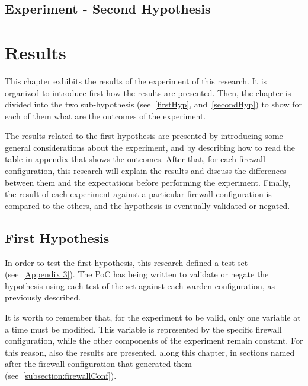 \documentclass[12pt]{article}
\begin{document}
\clearpage

\subsection{Experiment - Second Hypothesis}
\label{sub:secondHypExp}


\pagebreak

\section{Results}
\label{sec:6}


This chapter exhibits the results of the experiment of this research. It is organized to introduce first how the results are presented. Then, the chapter is divided into the two sub-hypothesis (see~\ref{firstHyp}, and~\ref{secondHyp}) to show for each of them what are the outcomes of the experiment.

The results related to the first hypothesis are presented by introducing some general considerations about the experiment, and by describing how to read the table in appendix that shows the outcomes. After that, for each firewall configuration, this research will explain the results and discuss the differences between them and the expectations before performing the experiment. Finally, the result of each experiment against a particular firewall configuration is compared to the others, and the hypothesis is eventually validated or negated.

\subsection{First Hypothesis}
\label{resultsFirstHypothesis}

In order to test the first hypothesis, this research defined a test set (see~\ref{Appendix 3}). The PoC has being written to validate or negate the hypothesis using each test of the set against each warden configuration, as previously described.

It is worth to remember that, for the experiment to be valid, only one variable at a time must be modified. This variable is represented by the specific firewall configuration, while the other components of the experiment remain constant. For this reason, also the results are presented, along this chapter, in sections named after the firewall configuration that generated them (see~\ref{subsection:firewallConf}).
\end{document}

